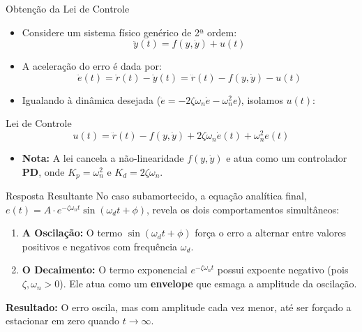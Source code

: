\documentclass[11pt, aspectratio=169]{beamer}
\begin{document}
\begin{frame}{Obtenção da Lei de Controle}
    \begin{itemize}
        \item Considere um sistema físico genérico de 2ª ordem: 
        \[ \ddot{y}(t) = f(y, \dot{y}) + u(t) \]
        \item A aceleração do erro é dada por: 
        \[ \ddot{e}(t) = \ddot{r}(t) - \ddot{y}(t) = \ddot{r}(t) - f(y, \dot{y}) - u(t) \]
        \item Igualando à dinâmica desejada ($\ddot{e} = -2\zeta\omega_n\dot{e} - \omega_n^2 e$), isolamos $u(t)$:
    \end{itemize}
    
    \begin{alertblock}{Lei de Controle}
        \[ u(t) = \ddot{r}(t) - f(y, \dot{y}) + 2\zeta\omega_n \dot{e}(t) + \omega_n^2 e(t) \]
    \end{alertblock}
    
    \begin{itemize}
        \item \textbf{Nota:} A lei cancela a não-linearidade $f(y, \dot{y})$ e atua como um controlador \textbf{PD}, onde $K_p = \omega_n^2$ e $K_d = 2\zeta\omega_n$.
    \end{itemize}
\end{frame}

\begin{frame}{Resposta Resultante}
    No caso subamortecido, a equação analítica final, $e(t) = A \cdot e^{-\zeta\omega_n t} \sin(\omega_d t + \phi)$, revela os dois comportamentos simultâneos:
    
    \vspace{0.5cm}
    
    \begin{enumerate}
        \item \textbf{A Oscilação:} O termo $\sin(\omega_d t + \phi)$ força o erro a alternar entre valores positivos e negativos com frequência $\omega_d$.
        \vspace{0.3cm}
        \item \textbf{O Decaimento:} O termo exponencial $e^{-\zeta\omega_n t}$ possui expoente negativo (pois $\zeta, \omega_n > 0$). Ele atua como um \textbf{envelope} que esmaga a amplitude da oscilação.
    \end{enumerate}
    
    \vspace{0.5cm}
    \textbf{Resultado:} O erro oscila, mas com amplitude cada vez menor, até ser forçado a estacionar em zero quando $t \to \infty$.
\end{frame}
\end{document}
